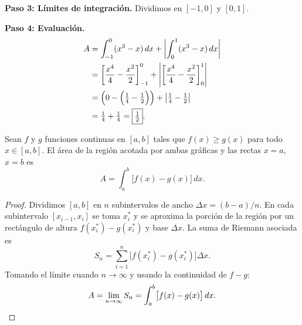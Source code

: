 \begin{example}
\begin{myproof}
\textbf{Paso 3: Límites de integración.} Dividimos en $[-1,0]$ y $[0,1]$.

\textbf{Paso 4: Evaluación.}
\begin{align*}
  A &= \int_{-1}^{0}(x^3-x)\,dx + \left|\int_{0}^{1}(x^3-x)\,dx\right| \\
    &= \left[\frac{x^4}{4}-\frac{x^2}{2}\right]_{-1}^{0}
       + \left|\left[\frac{x^4}{4}-\frac{x^2}{2}\right]_{0}^{1}\right| \\
    &= \left(0 - \Bigl(\tfrac{1}{4}-\tfrac{1}{2}\Bigr)\right)
       + \left|\tfrac{1}{4}-\tfrac{1}{2}\right| \\
    &= \tfrac{1}{4} + \tfrac{1}{4} = \boxed{\tfrac{1}{2}}.
\end{align*}
\end{myproof}
\end{example}

\begin{theorem}
Sean $f$ y $g$ funciones continuas en $[a,b]$ tales que $f(x)\geq g(x)$
para todo $x\in[a,b]$. El área de la región acotada por ambas gráficas y
las rectas $x=a$, $x=b$ es
\[
  A = \int_a^b \bigl[f(x)-g(x)\bigr]\,dx.
\]
\end{theorem}

\begin{proof}
Dividimos $[a,b]$ en $n$ subintervalos de ancho $\Delta x=(b-a)/n$.
En cada subintervalo $[x_{i-1},x_i]$ se toma $x_i^*$ y se aproxima la
porción de la región por un rectángulo de altura $f(x_i^*)-g(x_i^*)$ y
base $\Delta x$. La suma de Riemann asociada es
\[
  S_n = \sum_{i=1}^n\bigl[f(x_i^*)-g(x_i^*)\bigr]\Delta x.
\]
Tomando el límite cuando $n\to\infty$ y usando la continuidad de $f-g$:
\[
  A = \lim_{n\to\infty} S_n
    = \int_a^b\bigl[f(x)-g(x)\bigr]\,dx.\qedhere
\]
\end{proof}

